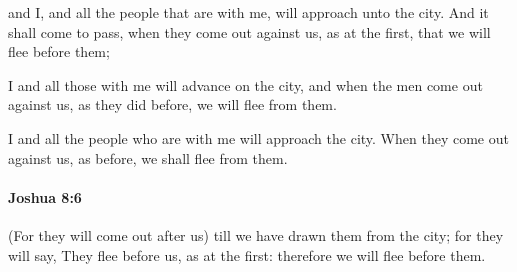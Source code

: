 			\begin{versebox}
					\item[BHS] 
					\item[ASV] and I, and all the people that are with me, will approach unto the city. And it shall come to pass, when they come out against us, as at the first, that we will flee before them;
					\item[NIV] I and all those with me will advance on the city, and when the men come out against us, as they did before, we will flee from them.
					\item[NRSV] I and all the people who are with me will approach the city. When they come out against us, as before, we shall flee from them.
			\end{versebox}

		\paragraph{Joshua 8:6} %
			\label{JOSHUA-8-6}

			(For they will come out after us) till we have drawn them from the city; for they will say, They flee before us, as at the first: therefore we will flee before them.

